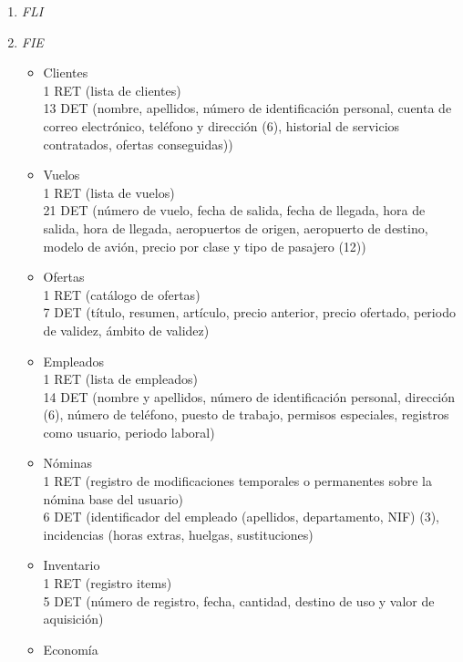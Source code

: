 \begin{enumerate}
	\item \textit{FLI}
	\item \textit{FIE}

		\begin{itemize}
			\item Clientes \\
			{1 RET (lista de clientes)}\\
			{13 DET (nombre, apellidos, número de identificación personal, cuenta de correo electrónico, teléfono y dirección (6),
			historial de servicios contratados, ofertas conseguidas))}\\
			\item Vuelos \\
			{1 RET (lista de vuelos)}\\
			{21 DET (número de vuelo, fecha de salida, fecha de llegada, hora de salida, hora de llegada, aeropuertos de origen,
			aeropuerto de destino, modelo de avión, precio por clase y tipo de pasajero (12))}\\
			\item Ofertas \\
			{1 RET (catálogo de ofertas)}\\
			{7 DET (título, resumen, artículo, precio anterior, precio ofertado, periodo de validez, ámbito de validez)}\\
			\item Empleados \\
			{1 RET (lista de empleados)}\\
			{14 DET (nombre y apellidos, número de identificación personal, dirección (6), número de teléfono, puesto de trabajo,
			permisos especiales, registros como usuario, periodo laboral)}\\
			\item Nóminas \\
			{1 RET (registro de modificaciones temporales o permanentes sobre la nómina base del usuario)}\\
			{6 DET (identificador del empleado (apellidos, departamento, NIF) (3), incidencias (horas extras, huelgas, sustituciones)}\\
			\item Inventario \\
			{1 RET (registro items)}\\
			{5 DET (número de registro, fecha, cantidad, destino de uso y valor de aquisición)}\\
			\item Economía \\

\end{itemize}
\end{enumerate}
